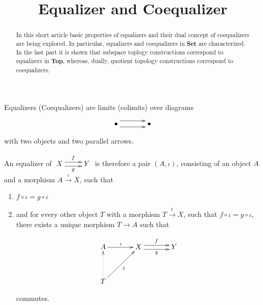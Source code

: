 \documentclass[a4paper]{amsart}            %
\theoremstyle{plain}                                               %
\begin{document}

\title{Equalizer and Coequalizer}

\begin{abstract}In this short article basic properties of equalizers and their dual concept of coequalizers are being explored. In particular, equalizers and coequalizers in \textbf{Set} are characterized. In the last part it is shown that subspace toplogy constructions correspond to equalizers in \textbf{Top}, whereas, dually, quotient topology constructions correspond to coequalizers.
\end{abstract}

\maketitle
\pagestyle{empty} %
\thispagestyle{empty}




Equalizers (Coequalizers) are limits (colimits) over diagrams

\begin{align*}
\xymatrix@=+1.25cm{ {\bullet} \ar@<-1ex>[r] \ar@<1ex>[r] & {\bullet}}
\end{align*}

with two objects and two parallel arrows.

An equalizer of $\xymatrix{X \ar@<0.66ex>[r]^{f} \ar@<-0.66ex>[r]_{g} & Y}$ is therefore a pair $(A,\iota)$, consisting of an object $A$ and a morphism $A \xrightarrow{\iota} X$, such that

\begin{enumerate}

\item $f \circ \iota = g \circ \iota$
\bigskip
\item and for every other object $T$ with a morphism $T \xrightarrow{t} X$, such that $f \circ \iota = g \circ \iota$, there exists a unique morphism $T \rightarrow A$ such that 

\begin{align*} \xymatrix@+=1.25cm{A \ar[r]^{\iota} & X \ar@<0.66ex>[r]^f \ar@<-0.66ex>[r]_g & Y \\
																										 T \ar@{.>}[u] \ar[ur]_t} \end{align*}
																										 
																										 commutes.
																										 																										 
\end{enumerate}	
\end{document}
